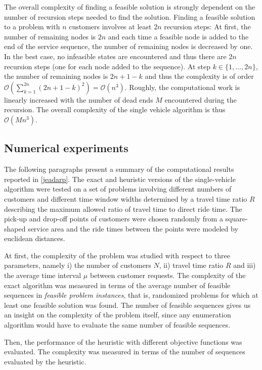 \documentclass[dissertation,draft*]{aaltoseries}
\begin{document}
The overall complexity of finding a feasible solution is strongly dependent on the number of recursion
steps needed to find the solution. 
Finding a feasible solution to a problem with $n$ customers involves at least $2n$
recursion steps: At first, the number of remaining nodes is $2n$ and each time 
a feasible node is added to the end of the service sequence, the 
number of remaining nodes is decreased by one.
In the best case, no infeasible states are encountered and thus there are $2n$ recursion steps 
(one for each node added to the sequence).
At step $k \in \{1,\ldots,2n\}$, the number of remaining nodes is $2n+1-k$
and thus the complexity is of order $\mathcal{O} (\sum_{k=1}^{2n} (2n+1-k)^2) =\mathcal{O}(n^3)$.
Roughly, the computational work is linearly increased with the 
number of dead ends $M$ encountered during the recursion.
The overall complexity of the single vehicle algorithm is thus $\mathcal{O}(Mn^3)$.


\subsection{Numerical experiments}
\label{svexperience}
The following paragraphs present a summary of the computational results reported in \ref{jeadarp}. 
The exact and heuristic versions of the single-vehicle algorithm
were tested on a set of problems involving different numbers of customers and different time
window widths determined by a travel time ratio $R$ describing the maximum allowed ratio of travel time
to direct ride time. The pick-up and drop-off points of customers were chosen randomly from a
square-shaped service area and the ride times between the points were modeled by euclidean distances.

At first, the complexity of the problem was studied with respect to three parameters, namely
i) the number of customers $N$, ii) travel time ratio $R$ and iii) the average time interval $\mu$
between customer requests. The complexity of the exact algorithm was measured in terms of the
average number of feasible sequences
in \emph{feasible problem instances}, that is, randomized
problems for which at least one feasible solution was found. 
The number of feasible sequences gives us an insight on the complexity of the problem itself,
since any enumeration algorithm would have to evaluate the same number of feasible sequences.

Then, the performance of the heuristic with different objective functions was evaluated.
The complexity was measured in terms of the number of sequences evaluated by the heuristic.
\end{document}
